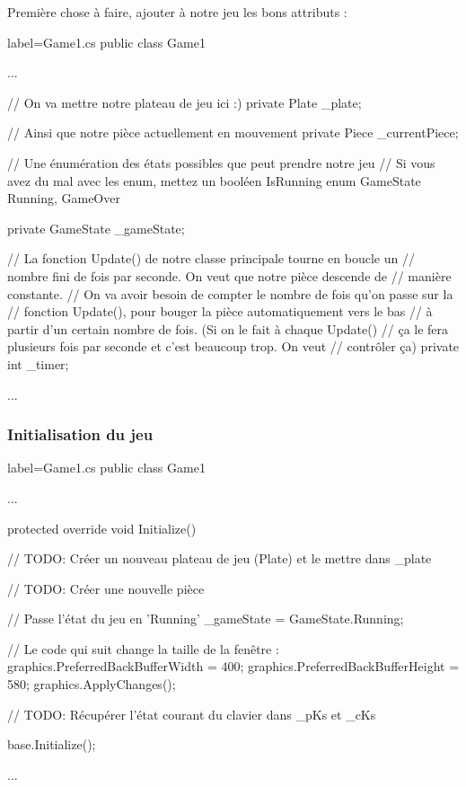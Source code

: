 \documentclass[a4paper]{article}
\begin{document}
Première chose à faire, ajouter à notre jeu les bons attributs :

\begin{csharpcode*}{label=Game1.cs}
public class Game1
{
    ...


    // On va mettre notre plateau de jeu ici :)
    private Plate _plate;

    // Ainsi que notre pièce actuellement en mouvement
    private Piece _currentPiece;

    // Une énumération des états possibles que peut prendre notre jeu
    // Si vous avez du mal avec les enum, mettez un booléen IsRunning
    enum GameState { Running, GameOver }

    private GameState _gameState;
    
    // La fonction Update() de notre classe principale tourne en boucle un
    // nombre fini de fois par seconde. On veut que notre pièce descende de
    // manière constante.
    // On va avoir besoin de compter le nombre de fois qu'on passe sur la
    // fonction Update(), pour bouger la pièce automatiquement vers le bas
    // à partir d'un certain nombre de fois. (Si on le fait à chaque Update()
    // ça le fera plusieurs fois par seconde et c'est beaucoup trop. On veut
    // contrôler ça)
    private int _timer;

    ...
}
\end{csharpcode*}

\subsubsection{Initialisation du jeu}

\begin{csharpcode*}{label=Game1.cs}
public class Game1
{
    ...

    protected override void Initialize()
    {
        // TODO: Créer un nouveau plateau de jeu (Plate) et le mettre dans _plate
        
        // TODO: Créer une nouvelle pièce
        
        // Passe l'état du jeu en 'Running'
        _gameState = GameState.Running;

        // Le code qui suit change la taille de la fenêtre :
        graphics.PreferredBackBufferWidth = 400;
        graphics.PreferredBackBufferHeight = 580;
        graphics.ApplyChanges();

        // TODO: Récupérer l'état courant du clavier dans _pKs et _cKs

        base.Initialize();
    }

    ...
}
\end{csharpcode*}
\end{document}
